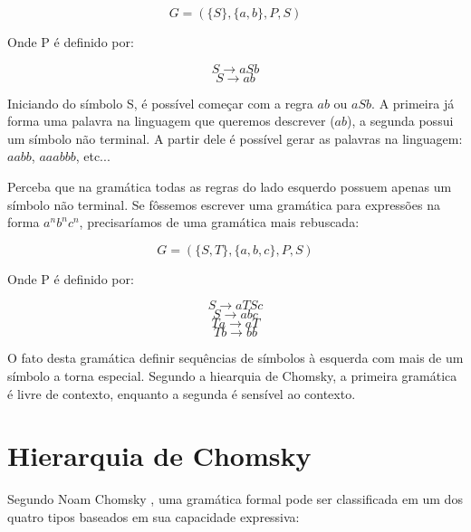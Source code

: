 \documentclass[a4paper,12pt,oneside,onecolumn]{uerj}
\begin{document}
\begin{equation*}
	G = ({\{S\}, \{a,b\}, P, S})
\end{equation*}

Onde P é definido por:

\begin{equation*}
	S \rightarrow aSb
\end{equation*}
\begin{equation*}
	S \rightarrow ab
\end{equation*}

Iniciando do símbolo S, é possível começar com a regra $ab$ ou $aSb$. A primeira já forma uma palavra na linguagem que queremos descrever ($ab$), a segunda possui um símbolo não terminal. A partir dele é possível gerar as palavras na linguagem: $aabb$, $aaabbb$, etc...

Perceba que na gramática todas as regras do lado esquerdo possuem apenas um símbolo não terminal. Se fôssemos escrever uma gramática para expressões na forma $a^nb^nc^n$, precisaríamos de uma gramática mais rebuscada:

\begin{equation*}
	G = (\{S, T\}, \{a,b,c\}, P, S)
\end{equation*}

Onde P é definido por:

\begin{equation*}
	S \rightarrow aTSc
\end{equation*}
\begin{equation*}
	S \rightarrow abc
\end{equation*}
\begin{equation*}
	Ta \rightarrow aT
\end{equation*}
\begin{equation*}
	Tb \rightarrow bb
\end{equation*}

O fato desta gramática definir sequências de símbolos à esquerda com mais de um símbolo a torna especial. Segundo a hiearquia de Chomsky, a primeira gramática é livre de contexto, enquanto a segunda é sensível ao contexto.

\section{Hierarquia de Chomsky}

Segundo Noam Chomsky \cite{bib:Chomsky57}, uma gramática formal pode ser classificada em um dos quatro tipos baseados em sua capacidade expressiva:
\end{document}
